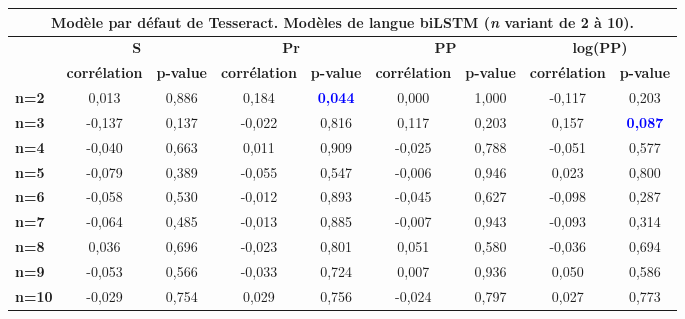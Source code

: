 \documentclass[10pt,twoside]{article}
\begin{document}
\begin{table}
\begin{center}
\begin{scriptsize}
\begin{tabular}{|l|c|c|c|c|c|c|c|c|}
    \end{tabular}
    \begin{tabular}{|l|c|c|c|c|c|c|c|c|}
    \multicolumn{9}{c}{{\footnotesize Modèle par défaut de Tesseract. Modèles de langue biLSTM (\textit{n} variant de 2 à 10).}}\\\hline
    \multirow{2}{*}{\textbf{}} & \multicolumn{2}{c|}{\textbf{S}}         & \multicolumn{2}{c|}{\textbf{Pr}}        & \multicolumn{2}{c|}{\textbf{PP}}        & \multicolumn{2}{c|}{\textbf{log(PP)}}   \\ \cline{2-9} 
                               & \textbf{corrélation} & \textbf{p-value} & \textbf{corrélation} & \textbf{p-value} & \textbf{corrélation} & \textbf{p-value} & \textbf{corrélation} & \textbf{p-value} \\ \hline
    \textbf{n=2}  & 0,013  & 0,886 & 0,184  & \textcolor{blue}{\textbf{0,044}} & 0,000  & 1,000 & -0,117 & 0,203 \\ \hline
    \textbf{n=3}  & -0,137 & 0,137 & -0,022 & 0,816          & 0,117  & 0,203 & 0,157  & \textcolor{blue}{\textbf{0,087}} \\ \hline
    \textbf{n=4}  & -0,040 & 0,663 & 0,011  & 0,909          & -0,025 & 0,788 & -0,051 & 0,577 \\ \hline
    \textbf{n=5}  & -0,079 & 0,389 & -0,055 & 0,547          & -0,006 & 0,946 & 0,023  & 0,800 \\ \hline
    \textbf{n=6}  & -0,058 & 0,530 & -0,012 & 0,893          & -0,045 & 0,627 & -0,098 & 0,287 \\ \hline
    \textbf{n=7}  & -0,064 & 0,485 & -0,013 & 0,885          & -0,007 & 0,943 & -0,093 & 0,314 \\ \hline
    \textbf{n=8}  & 0,036  & 0,696 & -0,023 & 0,801          & 0,051  & 0,580 & -0,036 & 0,694 \\ \hline
    \textbf{n=9}  & -0,053 & 0,566 & -0,033 & 0,724          & 0,007  & 0,936 & 0,050  & 0,586 \\ \hline
    \textbf{n=10} & -0,029 & 0,754 & 0,029  & 0,756          & -0,024 & 0,797 & 0,027  & 0,773 \\ \hline




\end{tabular}
\end{scriptsize}
\end{center}
\end{table}
\end{document}
